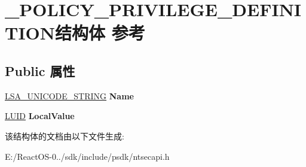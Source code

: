 \hypertarget{struct___p_o_l_i_c_y___p_r_i_v_i_l_e_g_e___d_e_f_i_n_i_t_i_o_n}{}\section{\+\_\+\+P\+O\+L\+I\+C\+Y\+\_\+\+P\+R\+I\+V\+I\+L\+E\+G\+E\+\_\+\+D\+E\+F\+I\+N\+I\+T\+I\+O\+N结构体 参考}
\label{struct___p_o_l_i_c_y___p_r_i_v_i_l_e_g_e___d_e_f_i_n_i_t_i_o_n}
\subsection*{Public 属性}
\begin{DoxyCompactItemize}
\item 
\mbox{\label{struct___p_o_l_i_c_y___p_r_i_v_i_l_e_g_e___d_e_f_i_n_i_t_i_o_n_abf6366b4be5b4bd9b6694b1590c35e7b}} 
\hyperlink{struct___l_s_a___u_n_i_c_o_d_e___s_t_r_i_n_g}{L\+S\+A\+\_\+\+U\+N\+I\+C\+O\+D\+E\+\_\+\+S\+T\+R\+I\+NG} {\bfseries Name}
\item 
\mbox{\label{struct___p_o_l_i_c_y___p_r_i_v_i_l_e_g_e___d_e_f_i_n_i_t_i_o_n_aefa15d6b27f3d927eeafeb915c523241}} 
\hyperlink{struct___l_u_i_d}{L\+U\+ID} {\bfseries Local\+Value}
\end{DoxyCompactItemize}


该结构体的文档由以下文件生成\+:\begin{DoxyCompactItemize}
\item 
E\+:/\+React\+O\+S-\/0../sdk/include/psdk/ntsecapi.\+h\end{DoxyCompactItemize}
